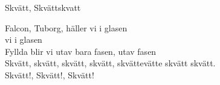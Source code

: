 \begin{song}{Skvätt, Skvätt}{skvatt}
\begin{vers}
Falcon, Tuborg, häller vi i glasen \\
vi i glasen\\
Fyllda blir vi utav bara fasen, utav fasen\\
Skvätt, skvätt, skvätt, skvätt, skvättevätte skvätt skvätt.\\
Skvätt!, Skvätt!, Skvätt!\\
\end{vers}
\end{song}
